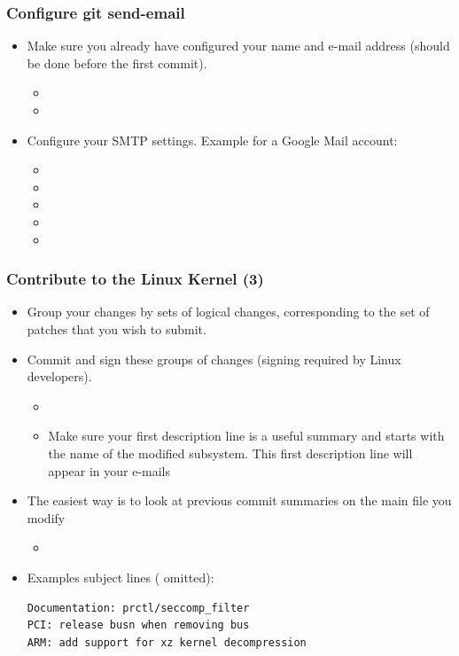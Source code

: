 \begin{frame}
  \frametitle{Configure git send-email}
  \begin{itemize}
  \item Make sure you already have configured your name and e-mail
    address (should be done before the first commit).
    \begin{itemize}
    \item {}
    \item {}
    \end{itemize}
  \item Configure your SMTP settings. Example for a Google Mail
    account:
    \begin{itemize}
    \item {}
    \item {}
    \item {}
    \item {}
    \item {}
    \end{itemize}
  \end{itemize}
\end{frame}

\begin{frame}[fragile]
  \frametitle{Contribute to the Linux Kernel (3)}
  \begin{itemize}
  \item Group your changes by sets of logical changes, corresponding
    to the set of patches that you wish to submit.
  \item Commit and sign these groups of changes (signing required by
    Linux developers).
    \begin{itemize}
    \item {}
    \item Make sure your first description line is a useful summary
      and starts with the name of the modified subsystem. This first
      description line will appear in your e-mails
    \end{itemize}
  \item The easiest way is to look at previous commit summaries on the
    main file you modify
      \begin{itemize}
      \item {}
      \end{itemize}
  \item Examples subject lines (\code{[PATCH]} omitted):
\begin{verbatim}
Documentation: prctl/seccomp_filter
PCI: release busn when removing bus
ARM: add support for xz kernel decompression
\end{verbatim}
  \end{itemize}
\end{frame}

